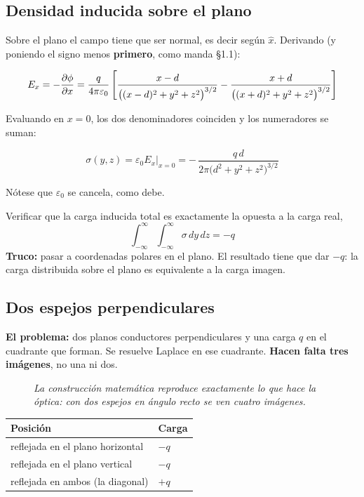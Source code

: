 \documentclass[12pt,a4paper]{article}
\begin{document}
\subsection{Densidad inducida sobre el plano}

Sobre el plano el campo tiene que ser normal, es decir según $\hat x$. Derivando
(y poniendo el signo menos \textbf{primero}, como manda §1.1):

\[
E_x = -\pdv{\phi}{x}
= \frac{q}{4\pi\varepsilon_0}\left[
\frac{x-d}{\big((x-d)^2+y^2+z^2\big)^{3/2}}
- \frac{x+d}{\big((x+d)^2+y^2+z^2\big)^{3/2}}\right]
\]

Evaluando en $x=0$, los dos denominadores coinciden y los numeradores se suman:

\[
\boxed{\;\sigma(y,z) = \varepsilon_0 E_x\big|_{x=0}
= -\,\frac{q\,d}{2\pi\big(d^2+y^2+z^2\big)^{3/2}}\;}
\]

Nótese que $\varepsilon_0$ se cancela, como debe.

\begin{notebox}
Verificar que la carga inducida total es exactamente la opuesta a la carga real,
\[
\int_{-\infty}^{\infty}\!\!\int_{-\infty}^{\infty}\sigma\,dy\,dz = -q
\]
\textbf{Truco:} pasar a coordenadas polares en el plano. El resultado tiene que dar
$-q$: la carga distribuida sobre el plano es equivalente a la carga imagen.
\end{notebox}

\subsection{Dos espejos perpendiculares}

\textbf{El problema:} dos planos conductores perpendiculares y una carga $q$ en el
cuadrante que forman. Se resuelve Laplace en ese cuadrante. \textbf{Hacen falta
tres imágenes}, no una ni dos.

\begin{figure}[H]
  \centering
  
  \caption*{\small\itshape La construcción matemática reproduce exactamente lo que
  hace la óptica: con dos espejos en ángulo recto se ven cuatro imágenes.}
\end{figure}

\begin{table}[H]
  \centering
  \begin{tabular}{@{}ll@{}}
    \toprule
    \textbf{Posición} & \textbf{Carga} \\
    \midrule
    reflejada en el plano horizontal & $-q$ \\
    reflejada en el plano vertical   & $-q$ \\
    reflejada en ambos (la diagonal) & $+q$ \\
    \bottomrule
  \end{tabular}
\end{table}
\end{document}
